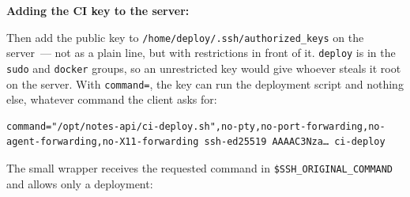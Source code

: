 \textbf{Adding the CI key to the server:}

\begin{codebox}[short]

\begin{Shaded}
\begin{Highlighting}[]
     

\end{Highlighting}
\end{Shaded}

\end{codebox}

\noindent{}Then add the public key to \texttt{/}\allowbreak{}\texttt{home/}\allowbreak{}\texttt{deploy/}\allowbreak{}\texttt{.}\allowbreak{}\texttt{ssh/}\allowbreak{}\texttt{authorized\_}\allowbreak{}\texttt{keys} on the server~--- not as a plain line, but with restrictions in front of it. \texttt{deploy} is in the \texttt{sudo} and \texttt{docker} groups, so an unrestricted key would give whoever steals it root on the server. With \texttt{command=}, the key can run the deployment script and nothing else, whatever command the client asks for:

\begin{outputbox}[short]
\begin{Verbatim}[fontsize=\codesize, breaklines, breakanywhere, breaksymbolleft={\tiny\textcolor{muted}{$\hookrightarrow$}}]
command="/opt/notes-api/ci-deploy.sh",no-pty,no-port-forwarding,no-agent-forwarding,no-X11-forwarding ssh-ed25519 AAAAC3Nza… ci-deploy
\end{Verbatim}
\end{outputbox}

\noindent{}The small wrapper receives the requested command in \texttt{\$SSH\_ORIGINAL\_COMMAND} and allows only a deployment:

